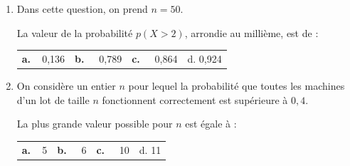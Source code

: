 \documentclass[10pt]{article}
\begin{document}
\begin{enumerate}[resume]
\item Dans cette question, on prend $n =50$.

La valeur de la probabilité $p(X > 2)$, arrondie au millième, est de :
\begin{center}
\begin{tabularx}{\linewidth}{*{4}{X}}
\textbf{a.~~}0,136 &\textbf{b.~~} 0,789 &\textbf{c.~~} 0,864 &d. 0,924
\end{tabularx}
\end{center}
\item On considère un entier $n$ pour lequel la probabilité que toutes les machines d'un lot de taille $n$ fonctionnent correctement est supérieure à $0,4$.

La plus grande valeur possible pour $n$ est égale à :
\begin{center}
\begin{tabularx}{\linewidth}{*{4}{X}}
\textbf{a.~~}5 &\textbf{b.~~} 6 &\textbf{c.~~} 10 &d. 11
\end{tabularx}
\end{center}
\end{enumerate}

\bigskip
\end{document}
